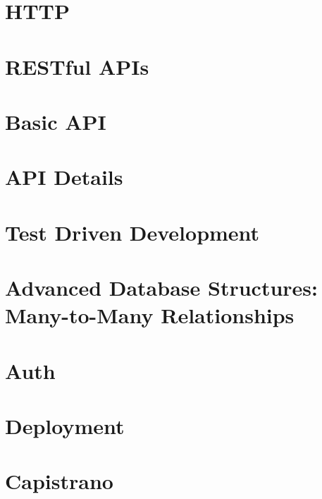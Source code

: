 \documentclass[b5paper,openany]{book}
\begin{document}
\tp


\tableofcontents



\chapter{HTTP}


\chapter{RESTful APIs}


\chapter{Basic API}


\chapter{API Details}


\chapter{Test Driven Development}


\chapter{Advanced Database Structures: Many-to-Many Relationships}


\chapter{Auth}


\chapter{Deployment}


\chapter{Capistrano}






\end{document}
